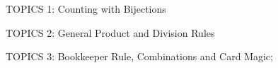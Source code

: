 \documentclass[handout]{mcs}
\begin{document}
\renewcommand{\reading}{
  Notes Ch.\bref{why_count_sec}--\bref{poker hands}
}



\begin{staffnotes}
TOPICS 1: Counting with Bijections
\end{staffnotes}



\begin{staffnotes}
TOPICS 2: General Product and Division Rules 
\end{staffnotes}


\begin{staffnotes}
TOPICS 3: Bookkeeper Rule, Combinations and Card Magic; 
\end{staffnotes}


\end{document}
